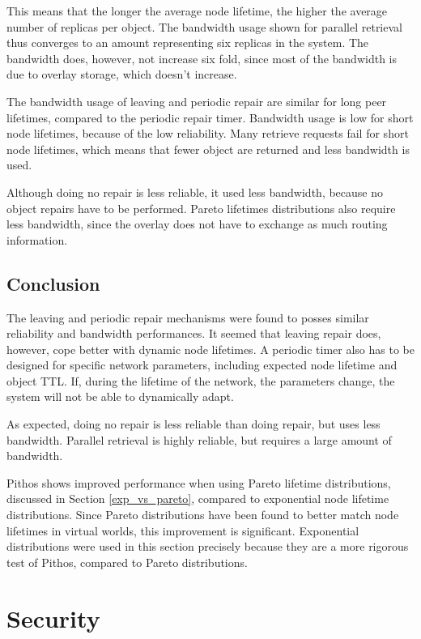 This means that the longer the average node lifetime, the higher the average number of replicas per object. The bandwidth usage shown for parallel retrieval thus converges to an amount representing six replicas in the system. The bandwidth does, however, not increase six fold, since most of the bandwidth is due to overlay storage, which doesn't increase.

The bandwidth usage of leaving and periodic repair are similar for long peer lifetimes, compared to the periodic repair timer. Bandwidth usage is low for short node lifetimes, because of the low reliability. Many retrieve requests fail for short node lifetimes, which means that fewer object are returned and less bandwidth is used.

Although doing no repair is less reliable, it used less bandwidth, because no object repairs have to be performed. Pareto lifetimes distributions also require less bandwidth, since the overlay does not have to exchange as much routing information.

\subsection{Conclusion}

The leaving and periodic repair mechanisms were found to posses similar reliability and bandwidth performances. It seemed that leaving repair does, however, cope better with dynamic node lifetimes. A periodic timer also has to be designed for specific network parameters, including expected node lifetime and object TTL. If, during the lifetime of the network, the parameters change, the system will not be able to dynamically adapt.

As expected, doing no repair is less reliable than doing repair, but uses less bandwidth. Parallel retrieval is highly reliable, but requires a large amount of bandwidth.

Pithos shows improved performance when using Pareto lifetime distributions, discussed in Section \ref{exp_vs_pareto}, compared to exponential node lifetime distributions. Since Pareto distributions have been found to better match node lifetimes in virtual worlds, this improvement is significant. Exponential distributions were used in this section precisely because they are a more rigorous test of Pithos, compared to Pareto distributions.

\section{Security}
\label{malicious_results}

